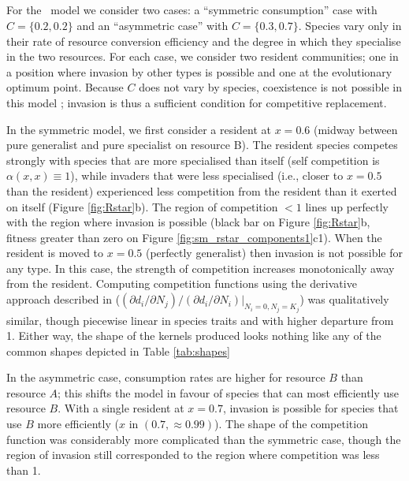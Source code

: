 \documentclass[a4paper,11pt]{article}
\begin{document}
%

\subsection{\Rstar}

For the \Rstar\ model we consider two cases: a ``symmetric
consumption'' case with $C = \{0.2, 0.2\}$ and an ``asymmetric case''
with $C = \{0.3, 0.7\}$.  Species vary only in their rate of resource
conversion efficiency and the degree in which they specialise in the
two resources.  For each case, we consider two resident communities;
one in a position where invasion by other types is possible and one at
the evolutionary optimum point.
%
Because $C$ does not vary by species, coexistence is not possible in
this model \citep{Tilman-1982}; invasion is thus a sufficient condition for
competitive replacement.

In the symmetric model, we first consider a resident at $x = 0.6$
(midway between pure generalist and pure specialist on resource B).
%
The resident species competes strongly with species that are more
specialised than itself (self competition is $\alpha(x, x) \equiv
1$), while invaders that were less specialised (i.e., closer to $x =
0.5$ than the resident) experienced less competition from the resident
than it exerted on itself (Figure \ref{fig:Rstar}b).
%
The region of competition $< 1$ lines up perfectly with the region
where invasion is possible (black bar on Figure \ref{fig:Rstar}b,
fitness greater than zero on Figure
\ref{fig:sm_rstar_components1}c1).
%
When the resident is moved to $x = 0.5$ (perfectly generalist) then
invasion is not possible for any type.  In this case, the strength of
competition increases monotonically away from the resident.
%
Computing competition functions using the derivative approach
described in \citet{Abrams-2008}
($(\partial d_i / \partial N_j) / (\partial d_i / \partial N_i) |_{N_i
  = 0, N_j = K_j}$)
was qualitatively similar, though piecewise linear in species traits
and with higher departure from 1. 
Either way, the shape of the kernels produced looks nothing like any of the
common shapes depicted in Table \ref{tab:shapes}

In the asymmetric case, consumption rates are higher for
resource $B$ than resource $A$; this shifts the model in favour of
species that can most efficiently use resource $B$.
%
With a single resident at $x = 0.7$, invasion is possible for species
that use $B$ more efficiently ($x$ in $(0.7, \approx 0.99)$).
%
The shape of the competition function was considerably more
complicated than the symmetric case, though the region of invasion
still corresponded to the region where competition was less than 1.
\end{document}
